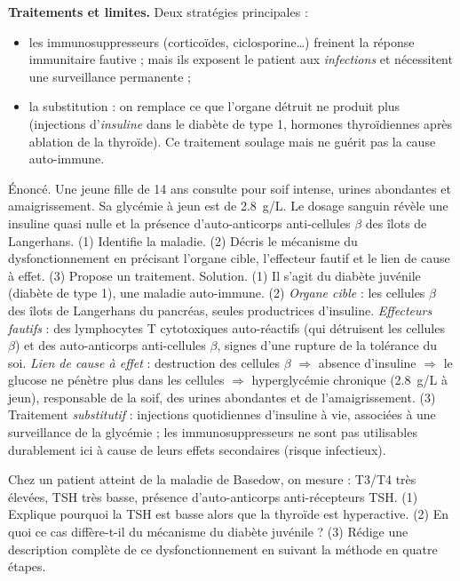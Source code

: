 \documentclass[11pt]{article}
\newcommand{\cle}[1]{{\popxbold\color{popdark}#1}}
\begin{document}
\textbf{Traitements et limites.} Deux stratégies principales :
\begin{itemize}
\item les \cle{immunosuppresseurs} (corticoïdes, ciclosporine\ldots) freinent la réponse immunitaire fautive ; mais ils exposent le patient aux \emph{infections} et nécessitent une surveillance permanente ;
\item la \cle{substitution} : on remplace ce que l'organe détruit ne produit plus (injections d'\emph{insuline} dans le diabète de type 1, hormones thyroïdiennes après ablation de la thyroïde). Ce traitement soulage mais ne guérit pas la cause auto-immune.
\end{itemize}

\begin{exoresolu}
Énoncé. Une jeune fille de 14 ans consulte pour soif intense, urines abondantes et amaigrissement. Sa glycémie à jeun est de \SI{2,8}{g/L}. Le dosage sanguin révèle une insuline quasi nulle et la présence d'auto-anticorps anti-cellules $\beta$ des îlots de Langerhans. (1) Identifie la maladie. (2) Décris le mécanisme du dysfonctionnement en précisant l'organe cible, l'effecteur fautif et le lien de cause à effet. (3) Propose un traitement.
\tcblower
Solution. (1) Il s'agit du \cle{diabète juvénile} (diabète de type 1), une maladie auto-immune. (2) \emph{Organe cible} : les cellules $\beta$ des îlots de Langerhans du pancréas, seules productrices d'insuline. \emph{Effecteurs fautifs} : des lymphocytes T cytotoxiques auto-réactifs (qui détruisent les cellules $\beta$) et des auto-anticorps anti-cellules $\beta$, signes d'une rupture de la tolérance du soi. \emph{Lien de cause à effet} : destruction des cellules $\beta$ $\Rightarrow$ absence d'insuline $\Rightarrow$ le glucose ne pénètre plus dans les cellules $\Rightarrow$ hyperglycémie chronique (\SI{2,8}{g/L} à jeun), responsable de la soif, des urines abondantes et de l'amaigrissement. (3) Traitement \emph{substitutif} : injections quotidiennes d'insuline à vie, associées à une surveillance de la glycémie ; les immunosuppresseurs ne sont pas utilisables durablement ici à cause de leurs effets secondaires (risque infectieux).
\end{exoresolu}

\begin{exercice}
Chez un patient atteint de la maladie de Basedow, on mesure : T3/T4 très élevées, TSH très basse, présence d'auto-anticorps anti-récepteurs TSH. (1) Explique pourquoi la TSH est basse alors que la thyroïde est hyperactive. (2) En quoi ce cas diffère-t-il du mécanisme du diabète juvénile ? (3) Rédige une description complète de ce dysfonctionnement en suivant la méthode en quatre étapes.
\end{exercice}
\end{document}
